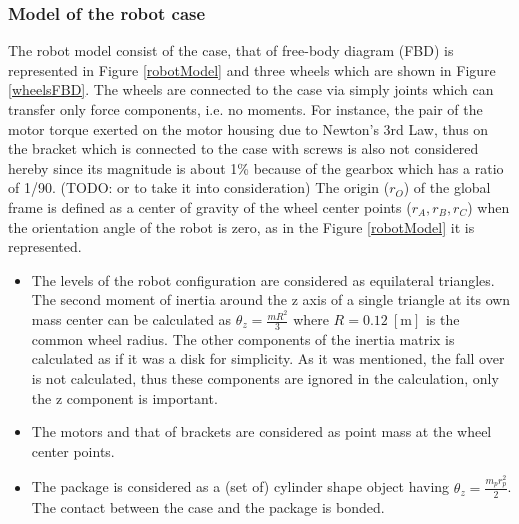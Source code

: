\documentclass[12pt,english]{article}
\begin{document}
\subsubsection{Model of the robot case}
The robot model consist of the case, that of free-body diagram (FBD) is represented in Figure \ref{robotModel} and three wheels which are shown in Figure \ref{wheelsFBD}. The wheels are connected to the case via simply joints which can transfer only force components, i.e. no moments. For instance, the pair of the motor torque exerted on the motor housing due to Newton's 3rd Law, thus on the bracket which is connected to the case with screws is also not considered hereby since its magnitude is about 1\% because of the gearbox which has a ratio of 1/90. (TODO: or to take it into consideration) The origin ($r_O$) of the global frame is defined as a center of gravity of the wheel center points ($r_A,r_B,r_C$) when the orientation angle of the robot is zero, as in the Figure \ref{robotModel} it is represented.
\begin{itemize}
	\item The levels of the robot configuration are considered as equilateral triangles. The second moment of inertia around the z axis of a single triangle at its own mass center can be calculated as $\theta_z=\frac{m R^2}{3}$ where $R=0.12~\left[\text{m}\right]$ is the common wheel radius. The other components of the inertia matrix is calculated as if it was a disk for simplicity. As it was mentioned, the fall over is not calculated, thus these components are ignored in the calculation, only the z component is important.
	\item The motors and that of brackets are considered as point mass at the wheel center points.
	\item The package is considered as a (set of) cylinder shape object having $\theta_z=\frac{m_p r_p^2}{2}$. The contact between the case and the package is bonded.
\end{itemize}
\end{document}
